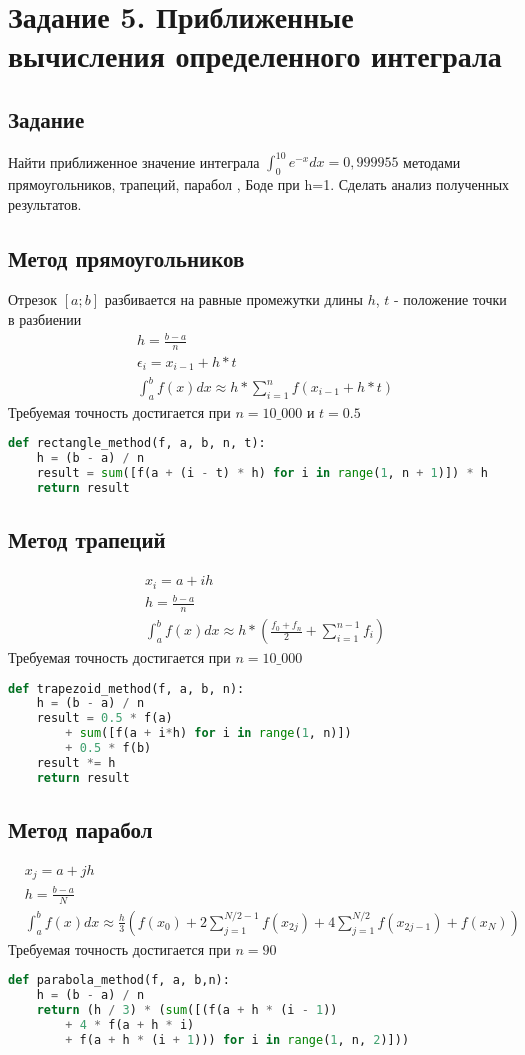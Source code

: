 \section{Задание 5. Приближенные вычисления определенного интеграла}
\subsection*{Задание}
Найти приближенное значение интеграла $ \int_0^{10}{e^{-x}	dx} = 0,999955 $ методами прямоугольников, трапеций, парабол , Боде при h=1. Сделать анализ полученных результатов.
\subsection*{Метод прямоугольников}
Отрезок $ [a;b] $ разбивается на равные промежутки длины $ h $, $ t $ - положение точки в разбиении 
\begin{align*}
	&h = \frac{b - a}{n} \\
	&\epsilon_i = x_{i - 1} + h * t \\
	&\int_{a}^{b} f(x)dx \approx h * \sum_{i = 1}^{n} f\left(x_{i-1} + h*t \right)
\end{align*}
Требуемая точность достигается при $ n = 10\_000 \text{ и } t = 0.5$
\begin{lstlisting}[language=Python]
def rectangle_method(f, a, b, n, t):
	h = (b - a) / n
	result = sum([f(a + (i - t) * h) for i in range(1, n + 1)]) * h
	return result
\end{lstlisting}
\subsection*{Метод трапеций}
\begin{align*}
	&x_i = a + ih \\
	&h = \frac{b - a}{n} \\
	&\int_a^b f(x) dx \approx h * \left(\frac{f_0 + f_n}{2} + \sum_{i = 1}^{n-1} f_i\right)
\end{align*}
Требуемая точность достигается при $ n = 10\_000 $
\begin{lstlisting}[language=Python]
def trapezoid_method(f, a, b, n):
	h = (b - a) / n
	result = 0.5 * f(a) 
		+ sum([f(a + i*h) for i in range(1, n)]) 
		+ 0.5 * f(b)
	result *= h
	return result
\end{lstlisting}
\subsection*{Метод парабол}
\begin{align*}
	&x_j = a + jh \\
	&h = \frac{b - a}{N} \\
	&\int_a^b f(x) dx \approx \frac{h}{3} \left(f(x_0)  + 2\sum_{j=1}^{N/2-1}f(x_{2j}) + 4\sum_{j=1}^{N/2}f(x_{2j-1}) + f(x_N)\right)
\end{align*}
Требуемая точность достигается при $ n = 90 $
\begin{lstlisting}[language=Python]
def parabola_method(f, a, b,n):
	h = (b - a) / n
	return (h / 3) * (sum([(f(a + h * (i - 1)) 
		+ 4 * f(a + h * i) 
		+ f(a + h * (i + 1))) for i in range(1, n, 2)]))
\end{lstlisting}
\newpage

